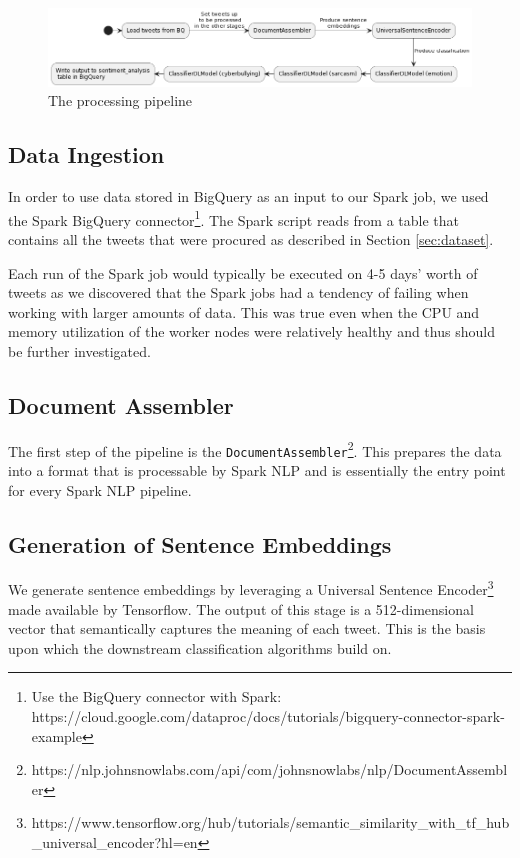 \documentclass[a4paper,12pt]{article}
\begin{document}
\begin{figure}[h]
\centering
\includegraphics[width=\textwidth]{data-processing.png}
\caption{The processing pipeline}
\label{fig:data-processing-pipeline}
\end{figure}

\subsection{Data Ingestion}
In order to use data stored in BigQuery as an input to our Spark job, we used the Spark BigQuery connector\footnote{Use the BigQuery connector with Spark: https://cloud.google.com/dataproc/docs/tutorials/bigquery-connector-spark-example}. The Spark script reads from a table that contains all the tweets that were procured as described in Section \ref{sec:dataset}. 

Each run of the Spark job would typically be executed on 4-5 days' worth of tweets as we discovered that the Spark jobs had a tendency of failing when working with larger amounts of data. This was true even when the CPU and memory utilization of the worker nodes were relatively healthy and thus should be further investigated.

\subsection{Document Assembler}
The first step of the pipeline is the \texttt{DocumentAssembler}\footnote{https://nlp.johnsnowlabs.com/api/com/johnsnowlabs/nlp/DocumentAssembler}. This prepares the data into a format that is processable by Spark NLP and is essentially the entry point for every Spark NLP pipeline.

\subsection{Generation of Sentence Embeddings}
\label{sec:sentence-embeddings}
We generate sentence embeddings by leveraging a Universal Sentence Encoder\footnote{https://www.tensorflow.org/hub/tutorials/semantic\_similarity\_with\_tf\_hub\_universal\_encoder?hl=en} made available by Tensorflow. The output of this stage is a 512-dimensional vector that semantically captures the meaning of each tweet. This is the basis upon which the downstream classification algorithms build on.
\end{document}
